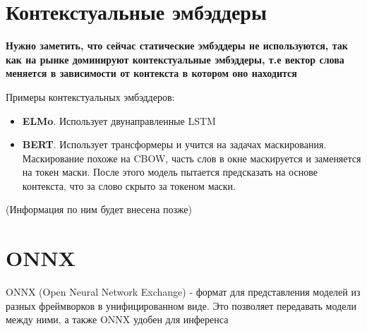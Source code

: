 \documentclass{article}
\begin{document}
    \section{Контекстуальные эмбэддеры} 

    \textbf{
        Нужно заметить, что сейчас статические эмбэддеры 
        не используются, так как на рынке доминируют контекстуальные эмбэддеры,
        т.е вектор слова меняется в зависимости от контекста в котором оно находится
    }

    \quad  

    Примеры контекстуальных эмбэддеров:
    \begin{itemize}
        \item \textbf{ELMo}. Использует двунаправленные LSTM 
        \item \textbf{BERT}. Использует трансформеры и учится на задачах маскирования.
        Маскирование похоже на CBOW, часть слов в окне маскируется и заменяется на токен маски.
        После этого модель пытается предсказать на основе контекста, что за слово скрыто за токеном маски.  
    \end{itemize} 

    (Информация по ним будет внесена позже)


    \section{ONNX}

    ONNX (Open Neural Network Exchange) - формат для представления моделей из разных фреймворков в унифицированном виде.
    Это позволяет передавать модели между ними, а также ONNX удобен для инференса 
\end{document}

